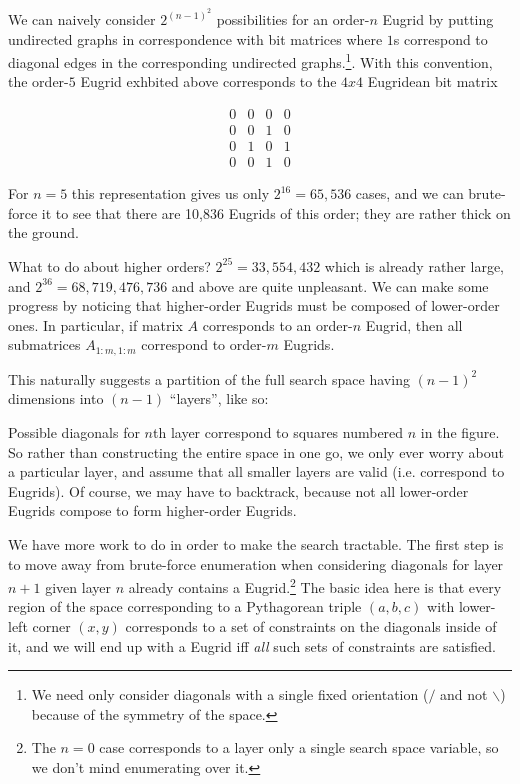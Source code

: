 \documentclass{article}
\begin{document}
We can naively consider $2^{(n-1)^2}$ possibilities for an order-$n$ Eugrid by putting
undirected graphs in correspondence with bit matrices where $1$s correspond to diagonal edges
in the corresponding undirected graphs.\footnote{We need only consider diagonals with a
single fixed orientation ($/$ and not $\backslash$) because of the symmetry of the
space.}. With this convention, the order-$5$ Eugrid exhbited above corresponds to the $4 x 4$
Eugridean bit matrix

\begin{equation*}
\begin{matrix}
  0 & 0 & 0 & 0 \\
  0 & 0 & 1 & 0 \\
  0 & 1 & 0 & 1 \\
  0 & 0 & 1 & 0
\end{matrix}
\end{equation*}

For $n=5$ this representation gives us only $2^{16} = 65,536$ cases, and we can brute-force
it to see that there are 10,836 Eugrids of this order; they are rather thick on the ground.

What to do about higher orders? $2^{25} = 33,554,432$ which is already rather large, and
$2^{36} = 68,719,476,736$ and above are quite unpleasant. We can make some progress by
noticing that higher-order Eugrids must be composed of lower-order ones. In particular, if
matrix $A$ corresponds to an order-$n$ Eugrid, then all submatrices $A_{1:m,1:m}$ correspond
to order-$m$ Eugrids.

This naturally suggests a partition of the full search space having $(n-1)^2$ dimensions into
$(n-1)$ ``layers'', like so:



Possible diagonals for $n$th layer correspond to squares numbered $n$ in the figure. So
rather than constructing the entire space in one go, we only ever worry about a particular
layer, and assume that all smaller layers are valid (i.e. correspond to Eugrids). Of course,
we may have to backtrack, because not all lower-order Eugrids compose to form higher-order
Eugrids.

We have more work to do in order to make the search tractable. The first step is to move away
from brute-force enumeration when considering diagonals for layer $n+1$ given layer $n$
already contains a Eugrid.\footnote{The $n=0$ case corresponds to a layer only a single
search space variable, so we don't mind enumerating over it.} The basic idea here is that
every region of the space corresponding to a Pythagorean triple $(a, b, c)$ with lower-left
corner $(x, y)$ corresponds to a set of constraints on the diagonals inside of it, and we
will end up with a Eugrid iff \emph{all} such sets of constraints are satisfied.
\end{document}
